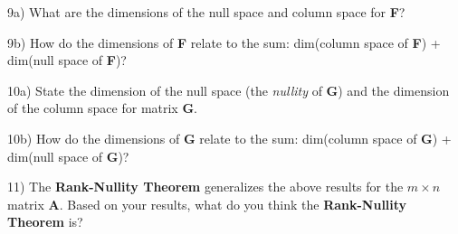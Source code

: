 \documentclass{article}
\begin{document}
\begin{flushleft}
9a) What are the dimensions of the null space and column space for \textbf{F}?

\vspace{0.75in}

9b) How do the dimensions of \textbf{F} relate to the sum: dim(column space of \textbf{F}) + dim(null space of \textbf{F})?

\vspace{1in}

10a) State the dimension of the null space (the \textit{nullity} of \textbf{G}) and the dimension of the column space for matrix \textbf{G}.

\vspace{0.75in}

10b) How do the dimensions of \textbf{G} relate to the sum: dim(column space of \textbf{G}) + dim(null space of \textbf{G})?

\vspace{1in}

11) The \textbf{Rank-Nullity Theorem} generalizes the above results for the $m\times n$ matrix \textbf{A}. Based on your results, what do you think the \textbf{Rank-Nullity Theorem} is?

\vspace{0.75in}

\end{flushleft}
\end{document}
